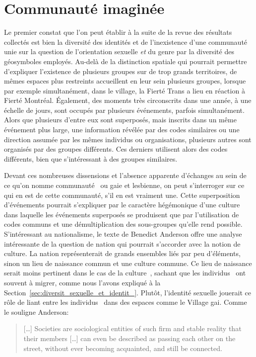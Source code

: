 \section{Communauté imaginée}
\label{sub:communaut_imagin_e}
Le premier constat que l'on peut établir à la suite de la revue des résultats collectés est bien la diversité des identités \lgbt{} et de l'inexistence d'une communauté unie sur la question de l'orientation sexuelle \emph{et} du genre par la diversité des géosymboles employés.
Au-delà de la distinction spatiale qui pourrait permettre d'expliquer l'existence de plusieurs groupes sur de trop grands territoires, de mêmes espaces plus restreints accueillent en leur sein plusieurs groupes, lorsque par exemple simultanément, dans le village, la Fierté Trans a lieu en réaction à Fierté Montréal.
Également, des moments très circonscrits dans une année, à une échelle de jours, sont occupés par plusieurs événements, parfois simultanément.
Alors que plusieurs d'entre eux sont superposés, mais inscrits dans un même événement plus large, une information révélée par des codes similaires ou une direction assumée par les mêmes individus ou organisations, plusieurs autres sont organisés par des groupes différents. 
Ces derniers utilisent alors des codes différents, bien que s'intéressant à des groupes similaires.

Devant ces nombreuses dissensions et l'absence apparente d'échanges au sein de ce qu'on nomme communauté~\lgbt{} ou gaie et lesbienne, on peut s'interroger sur ce qui en est de cette communauté, s'il en est vraiment une.
Cette superposition d'événements pourrait s'expliquer par le caractère hégémonique d'une culture~\lgbt{} dans  laquelle les événements superposés se produisent que par l'utilisation de codes communs et une démultiplication des sous-groupes qu'elle rend possible.
S'intéressant au nationalisme, le texte de Benedict Anderson offre une analyse intéressante de la question de nation qui pourrait s'accorder avec la notion de culture. 
La nation représenterait de grands ensembles liés par peu d'éléments, sinon un lieu de naissance commun et une culture commune.
Ce lieu de naissance serait moins pertinent dans le cas de la culture~\lgbt{}, sachant que les individus~\lgbt{} ont souvent à migrer, comme nous l'avons expliqué à la Section~\ref{sec:diversit_sexuelle_et_identit_}.
Plutôt, l'identité sexuelle jouerait ce rôle de liant entre les individus~\lgbt{} dans des espaces comme le Village gai.
Comme le souligne Anderson:
\begin{quote}
  [\ldots] Societies are sociological entities of such firm and stable reality that their members [\ldots] can even be described as passing each other on the street, without ever becoming acquainted, and still be connected.~\citep[25]{Anderson1983}
\end{quote}

